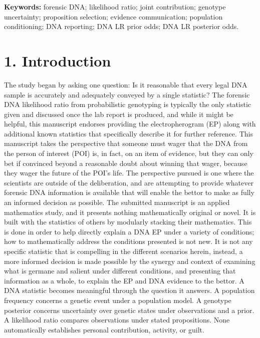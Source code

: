 \documentclass[
]{article}
\begin{document}
\textbf{Keywords:} forensic DNA; likelihood ratio; joint contribution;
genotype uncertainty; proposition selection; evidence communication;
population conditioning; DNA reporting; DNA LR prior odds; DNA LR
posterior odds.

\section{1. Introduction}\label{introduction}

The study began by asking one question: Is it reasonable that every
legal DNA sample is accurately and adequately conveyed by a single
statistic? The forensic DNA likelihood ratio from probabilistic
genotyping is typically the only statistic given and discussed once the
lab report is produced, and while it might be helpful, this manuscript
endorses providing the electropherogram (EP) along with additional known
statistics that specifically describe it for further reference. This
manuscript takes the perspective that someone must wager that the DNA
from the person of interest (POI) is, in fact, on an item of evidence,
but they can only bet if convinced beyond a reasonable doubt about
winning that wager, because they wager the future of the POI's life. The
perspective pursued is one where the scientists are outside of the
deliberation, and are attempting to provide whatever forensic DNA
information is available that will enable the bettor to make as fully an
informed decision as possible. The submitted manuscript is an applied
mathematics study, and it presents nothing mathematically original or
novel. It is built with the statistics of others by modularly stacking
their mathematics. This is done in order to help directly explain a DNA
EP under a variety of conditions; how to mathematically address the
conditions presented is not new. It is not any specific statistic that
is compelling in the different scenarios herein, instead, a more
informed decision is made possible by the synergy and context of
examining what is germane and salient under different conditions, and
presenting that information as a whole, to explain the EP and DNA
evidence to the bettor. A DNA statistic becomes meaningful through the
question it answers. A population frequency concerns a genetic event
under a population model. A genotype posterior concerns uncertainty over
genetic states under observations and a prior. A likelihood ratio
compares observations under stated propositions. None automatically
establishes personal contribution, activity, or guilt.
\end{document}

